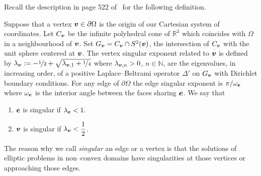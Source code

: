 Recall the description in page 522 of~\cite{apelNicaise} for the following 
definition. 
\begin{defi}
Suppose that a vertex
$\boldsymbol{v}\in\partial\Omega$ is the origin of our Cartesian system of coordinates. Let $C_{\boldsymbol{v}}$ be the infinite
polyhedral cone of $\mathbb{R}^3$ which coincides with $\Omega$ in a neighbourhood of 
$\boldsymbol{v}$. Set $G_{\boldsymbol{v}} = C_{\boldsymbol{v}}\cap S^2(\boldsymbol{v})$, the intersection of $C_{\boldsymbol{v}}$ with
the unit sphere centered at $\boldsymbol{v}$. The vertex singular exponent related to $\boldsymbol{v}$
is defined by $\lambda_{\boldsymbol{v}} := -\nicefrac12 + \sqrt{\lambda_{\boldsymbol{v},1} + \nicefrac14}$
where 
$\lambda_{\boldsymbol{v},n} > 0$, $n\in\mathbb{N}$, are the eigenvalues, in increasing order, of a positive
Laplace--Beltrami operator $\Delta'$ on $G_{\boldsymbol{v}}$ with Dirichlet boundary
conditions. For any edge of $\partial\Omega$ the edge
singular exponent is 
$\pi/\omega_{\boldsymbol{e}}$ where $\omega_{\boldsymbol{e}}$ is the interior angle between
the faces sharing  $\boldsymbol{e}$.
We say that
  \begin{enumerate}
    \item $\boldsymbol{e}$ is singular if $\lambda_{\boldsymbol{e}} < 1.$ 
    \item $\boldsymbol{v}$ is singular if $\lambda_{\boldsymbol{v}} < \dfrac12$.
  \end{enumerate}
\end{defi}
The reason why we call \textsl{singular} an edge or a vertex is that
the solutions of elliptic problems in non--convex domains have singularities
at those vertices or approaching those edges.

